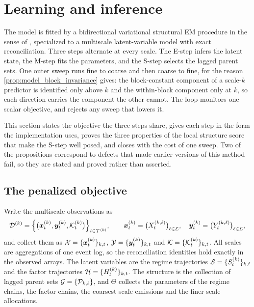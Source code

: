 \section{Learning and inference}
\label{sec:learning}

The model is fitted by a bidirectional variational structural EM procedure in the sense of
\citet{friedman1998learning}, specialized to a multiscale latent-variable model with exact
reconciliation. Three steps alternate at every scale. The E-step infers the latent state, the
M-step fits the parameters, and the S-step selects the lagged parent sets. One outer sweep runs
fine to coarse and then coarse to fine, for the reason
\cref{prop:model_block_invariance} gives: the block-constant component of a
scale-\(k\) predictor is identified only above \(k\) and the within-block
component only at \(k\), so each direction carries the component the other
cannot. The loop monitors one scalar objective, and rejects any sweep that
lowers it.

This section states the objective the three steps share, gives each step in the form the
implementation uses, proves the three properties of the local structure score that make the
S-step well posed, and closes with the cost of one sweep. Two of the propositions correspond to
defects that made earlier versions of this method fail, so they are stated and proved rather
than asserted.

\subsection{The penalized objective}
\label{sec:learning:objective}

Write the multiscale observations as
\[
{\mathcal{D}}^{(k)}
=
\Big\{
\big({\bm{x}}_t^{(k)}, {\bm{y}}_t^{(k)}, {\mathcal{K}}_t^{(k)}\big)
\Big\}_{t \in {\mathcal{T}}^{(k)}},
\qquad
{\bm{x}}_t^{(k)} = \big(X_t^{(k,\ell)}\big)_{\ell \in {\mathcal{L}}},
\quad
{\bm{y}}_t^{(k)} = \big(Y_t^{(k,\ell)}\big)_{\ell \in {\mathcal{L}}},
\]
and collect them as ${\mathcal{X}} = \{{\bm{x}}_t^{(k)}\}_{k,t}$, ${\mathcal{Y}} = \{{\bm{y}}_t^{(k)}\}_{k,t}$ and
${\mathcal{K}} = \{{\mathcal{K}}_t^{(k)}\}_{k,t}$. All scales are aggregations of one event log, so the
reconciliation identities hold exactly in the observed arrays. The latent variables are the
regime trajectories ${\mathcal{S}} = \{S_t^{(k)}\}_{k,t}$ and the factor trajectories
${\mathcal{H}} = \{H_t^{(k)}\}_{k,t}$. The structure is the collection of lagged parent sets
${\mathcal{G}} = \{{\mathcal{P}}_{k,\ell}\}$, and $\Theta$ collects the parameters of the regime chains, the factor
chains, the coarsest-scale emissions and the finer-scale allocations.

